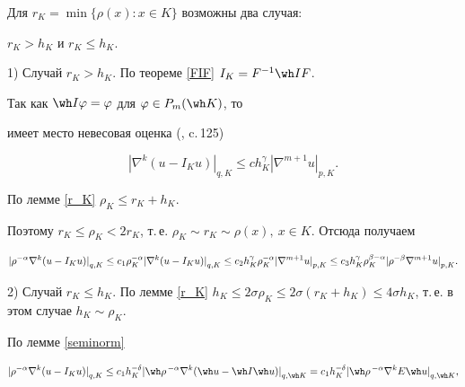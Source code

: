 \begin{pf}


Для $r_K=\min\{\rho(x): x \in K\}$ возможны два случая: 


$r_K >h _K$ и $r_K \le h_K$.





1) Случай $r_K >h _K$. По теореме \ref{FIF}\; $I_K=F^{-1} \wh I F$. 


Так как $\wh I \varphi = \varphi$ для $\varphi \in P_m(\wh K)$, то 


имеет место невесовая оценка (\cite{Ciarlet}, c.\,125)


$$


{| \nabla ^k (u-I_Ku)|}_{q,K} \le c h_K^\gamma {|\nabla^{m+1}u|}_{p,K}.


$$


По лемме \ref{r_K}\; $\rho_K \le r_K+h_K$. 


Поэтому $r_K \le \rho_K < 2 r_K$, т.\,е. $\rho_K \sim r_K \sim 


\rho(x), \ x \in K$. Отсюда получаем 


$$


{|\rho^{-\alpha} \nabla ^k (u-I_Ku)|}_{q,K} \le c_1 \rho_K^{-\alpha} 


{|\nabla ^k (u-I_Ku)|}_{q,K} \le \\ 


c_2 h_K^\gamma \rho_K^{-\alpha} {|\nabla^{m+1}u|}_{p,K} 


\le c_3 h_K^\gamma \rho_K^{\beta-\alpha}{|\rho^{-\beta}\nabla^{m+1}u|}_{p,K}.


$$





2) Случай $r_K \le h_K$. По лемме \ref{r_K}\; $h_K \le 2\sigma \rho_K \le 


2 \sigma (r_K+h_K) \le 4 \sigma h_K$, т.\,е. в этом случае $h_K \sim \rho_K$. 


По лемме \ref{seminorm} 


\begin{equation} \label{rho^alpha}


{|\rho^{-\alpha} \nabla ^k (u-I_Ku)|}_{q,K} \le 


c_1 h_K^{-\delta}{|\wh \rho^{\,-\alpha} \nabla ^k


(\wh u-\wh I \wh u)|}_{q,\wh K}= 


c_1 h_K^{-\delta}{|\wh \rho^{\,-\alpha} \nabla ^k E\wh u|}_{q,\wh K}, 


\end{equation}



\end{pf}

